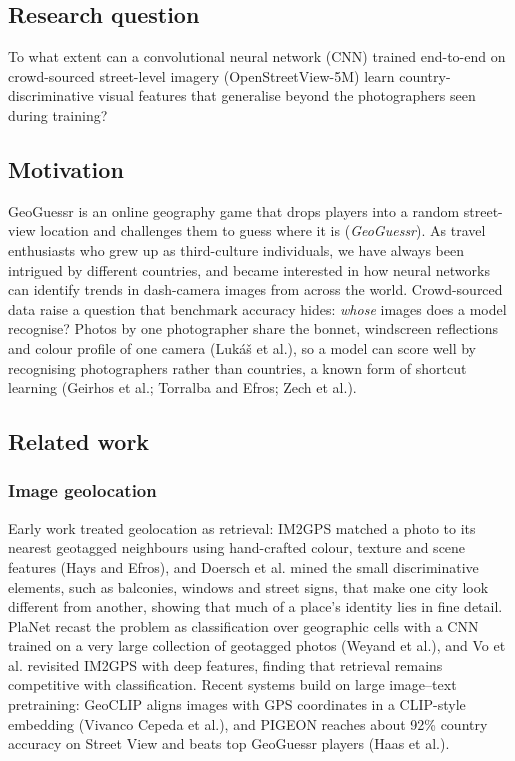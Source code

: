 \documentclass[11pt]{article}
\begin{document}
\subsection{Research question}
To what extent can a convolutional neural network (CNN) trained end-to-end on crowd-sourced
street-level imagery (OpenStreetView-5M) learn country-discriminative visual features that generalise
beyond the photographers seen during training?

\subsection{Motivation}
GeoGuessr is an online geography game that drops players into a random street-view location and
challenges them to guess where it is (\emph{GeoGuessr}). As travel enthusiasts who grew up as
third-culture individuals, we have always been intrigued by different countries, and became interested in
how neural networks can identify trends in dash-camera images from across the world. Crowd-sourced data
raise a question that benchmark accuracy hides: \emph{whose} images does a model recognise? Photos by
one photographer share the bonnet, windscreen reflections and colour profile of one camera (Luk\'a\v{s}
et al.), so a model can score well by recognising photographers rather than countries, a known form of
shortcut learning (Geirhos et al.; Torralba and Efros; Zech et al.).

\subsection{Related work}
\subsubsection{Image geolocation}
Early work treated geolocation as retrieval: IM2GPS matched a photo to its
nearest geotagged neighbours using hand-crafted colour, texture and scene features (Hays and Efros), and
Doersch et al. mined the small discriminative elements, such as balconies, windows and street signs, that
make one city look different from another, showing that much of a place's identity lies in fine detail.
PlaNet recast the problem as classification over geographic cells with a CNN trained on a very large
collection of geotagged photos (Weyand et al.), and Vo et al. revisited IM2GPS with deep features, finding
that retrieval remains competitive with classification. Recent systems build on large image--text
pretraining: GeoCLIP aligns images with GPS coordinates in a CLIP-style embedding (Vivanco Cepeda et al.),
and PIGEON reaches about 92\% country accuracy on Street View and beats top GeoGuessr players (Haas et al.).
\end{document}
